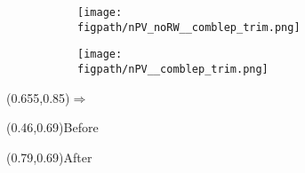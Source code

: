 \begin{frame}
\begin{figure}
		\begin{subfigure}[t]{0.32\textwidth}
			\texttt{[image: \\figpath/nPV\_noRW\_\_comblep\_trim.png]}
		\end{subfigure}
		\begin{subfigure}[t]{0.32\textwidth}
			\texttt{[image: \\figpath/nPV\_\_comblep\_trim.png]}
		\end{subfigure}
	\end{figure}
	\begin{textblock}{0.2}(0.655,0.85){\color{Orange}$\Rightarrow$}\end{textblock}
	\begin{textblock}{0.35}(0.46,0.69){\color{Orange}\Large{Before}}\end{textblock}
	\begin{textblock}{0.35}(0.79,0.69){\color{Orange}\Large{After}}\end{textblock}
\end{frame}


